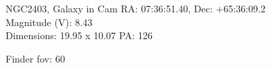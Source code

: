 \begin{block}{NGC2403, Galaxy in Cam}
    RA: 07:36:51.40, Dec: +65:36:09.2 \\ 
    Magnitude (V): 8.43 \\ 
    Dimensions: 19.95 x 10.07 PA: 126 

    Finder fov: 60 
\end{block}